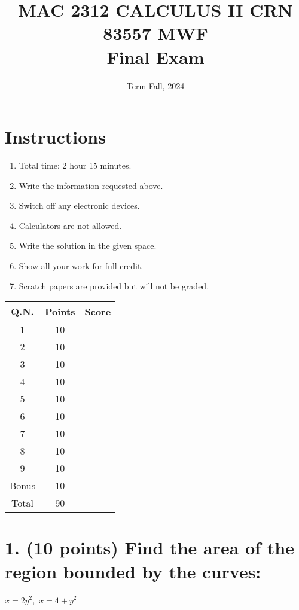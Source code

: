 \documentclass[12pt]{article}
\title{MAC 2312 CALCULUS II CRN 83557 MWF \\ Final Exam}
\date{Term Fall, 2024}
\begin{document}
\maketitle

\section*{Instructions}

\begin{enumerate}
    \item Total time: 2 hour 15 minutes. 
    \item Write the information requested above.
    \item Switch off any electronic devices.
    \item Calculators are not allowed.
    \item Write the solution in the given space.
    \item Show all your work for full credit.
    \item Scratch papers are provided but will not be graded.
\end{enumerate}

\bigskip

\begin{center}
\begin{tabular}{|c|c|c|}
\hline
Q.N. & Points & Score \\
\hline
1 & 10 &  \\
2 & 10 &  \\
3 & 10 &  \\
4 & 10 &  \\
5 & 10 &  \\
6 & 10 &  \\
7 & 10 &  \\
8 & 10 &  \\
9 & 10 &  \\
Bonus & 10 &  \\
Total & 90 &  \\
\hline
\end{tabular}
\end{center}

\newpage

\section*{1. (10 points) Find the area of the region bounded by the curves:}

$x=2y^{2}, $ $x=4+y^{2}$  

\newpage
\end{document}

